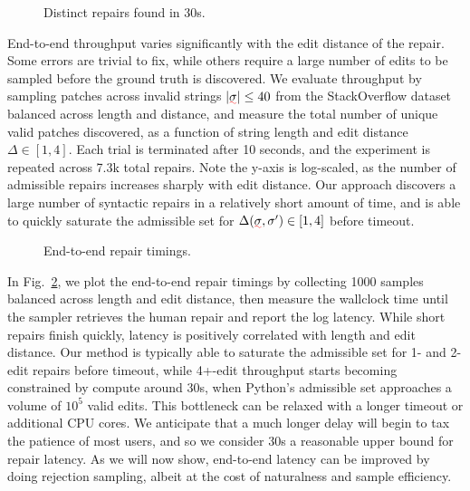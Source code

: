 \documentclass[sigplan,review,acmsmall,nonacm,anonymous]{acmart}\settopmatter{printfolios=false,printccs=false,printacmref=false}
\begin{document}
  \begin{figure}
    \vspace{-0.4cm}
    \resizebox{.35\textwidth}{!}{}
    \caption{Distinct repairs found in 30s.}
    \label{fig:throughput}
    \vspace{-0.4cm}
  \end{figure}

  End-to-end throughput varies significantly with the edit distance of the repair. Some errors are trivial to fix, while others require a large number of edits to be sampled before the ground truth is discovered. We evaluate throughput by sampling patches across invalid strings $|\err\sigma| \leq 40$ from the StackOverflow dataset balanced across length and distance, and measure the total number of unique valid patches discovered, as a function of string length and edit distance $\Delta\in[1, 4]$. Each trial is terminated after 10 seconds, and the experiment is repeated across 7.3k total repairs. Note the y-axis is log-scaled, as the number of admissible repairs increases sharply with edit distance. Our approach discovers a large number of syntactic repairs in a relatively short amount of time, and is able to quickly saturate the admissible set for $\Delta(\err\sigma, \sigma') \in [1, 4]$ before timeout.

  \begin{figure}
    \vspace{-0.4cm}
    \resizebox{.35\textwidth}{!}{}
    \caption{End-to-end repair timings.}
    \label{fig:timings}
    \vspace{-0.4cm}
  \end{figure}

  In Fig.~\ref{fig:timings}, we plot the end-to-end repair timings by collecting 1000 samples balanced across length and edit distance, then measure the wallclock time until the sampler retrieves the human repair and report the log latency. While short repairs finish quickly, latency is positively correlated with length and edit distance. Our method is typically able to saturate the admissible set for 1- and 2-edit repairs before timeout, while 4+-edit throughput starts becoming constrained by compute around 30s, when Python's admissible set approaches a volume of $10^5$ valid edits. This bottleneck can be relaxed with a longer timeout or additional CPU cores. We anticipate that a much longer delay will begin to tax the patience of most users, and so we consider 30s a reasonable upper bound for repair latency. As we will now show, end-to-end latency can be improved by doing rejection sampling, albeit at the cost of naturalness and sample efficiency.
\end{document}
